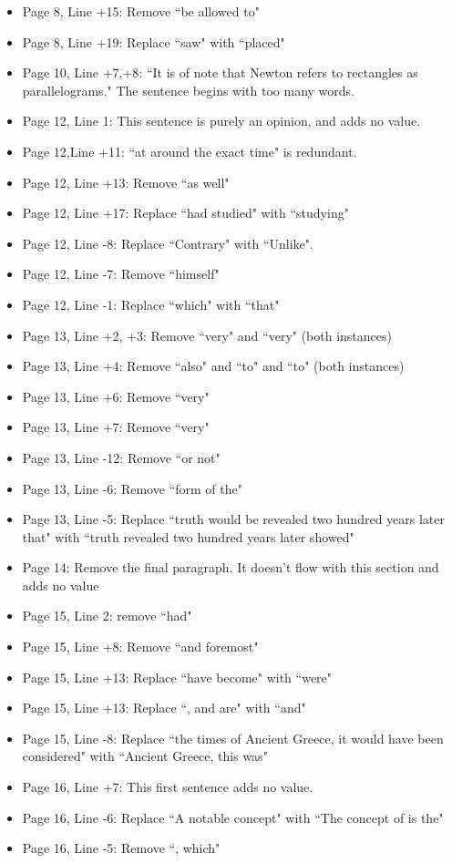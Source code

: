 \documentclass[11pt]{article}
\begin{document}
\begin{itemize}
\begin{itemize}
		\item Page 8, Line +15: Remove ``be allowed to"
		\item Page 8, Line +19: Replace ``saw" with ``placed"
		\item Page 10, Line +7,+8: ``It is of note that Newton refers to rectangles as parallelograms." The sentence begins with too many words.
		\item Page 12, Line 1: This sentence is purely an opinion, and adds no value.
		\item Page 12,Line +11: ``at around the exact time" is redundant.
		\item Page 12, Line +13: Remove ``as well"
		\item Page 12, Line +17: Replace ``had studied" with ``studying"
		\item Page 12, Line -8: Replace ``Contrary" with ``Unlike".
		\item Page 12, Line -7: Remove ``himself"
		\item Page 12, Line -1: Replace ``which" with ``that"
		\item Page 13, Line +2, +3: Remove ``very" and ``very" (both instances)
		\item Page 13, Line +4: Remove ``also" and ``to" and ``to" (both instances)
		\item Page 13, Line +6: Remove ``very"
		\item Page 13, Line +7: Remove ``very"
		\item Page 13, Line -12: Remove ``or not"
		\item Page 13, Line -6: Remove ``form of the"
		\item Page 13, Line -5: Replace ``truth would be revealed two hundred years later that" with ``truth revealed two hundred years later showed"
		\item Page 14: Remove the final paragraph. It doesn't flow with this section and adds no value
		\item Page 15, Line 2: remove ``had"
		\item Page 15, Line +8: Remove ``and foremost"
		\item Page 15, Line +13: Replace ``have become" with ``were"
		\item Page 15, Line +13: Replace ``, and are" with ``and"
		\item Page 15, Line -8: Replace ``the times of Ancient Greece, it would have been considered" with ``Ancient Greece, this was"
		\item Page 16, Line +7: This first sentence adds no value. 
		\item Page 16, Line -6: Replace ``A notable concept" with ``The concept of is the"
		\item Page 16, Line -5: Remove ``, which"
	\end{itemize}
	

\end{itemize}
\end{document}
